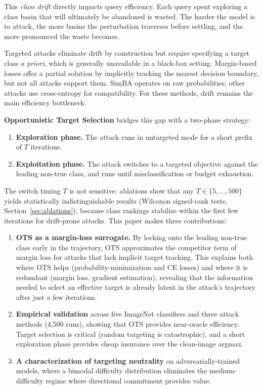 \documentclass{cap2026}
\begin{document}
This \textit{class drift} directly impacts query efficiency. Each query spent exploring a class basin that will ultimately be abandoned is wasted. The harder the model is to attack, the more basins the perturbation traverses before settling, and the more pronounced the waste becomes.

Targeted attacks eliminate drift by construction but require specifying a target class \textit{a priori}, which is generally unavailable in a black-box setting. Margin-based losses \citep{carlini2017towards} offer a partial solution by implicitly tracking the nearest decision boundary, but not all attacks support them. SimBA operates on raw probabilities; other attacks use cross-entropy for compatibility. For these methods, drift remains the main efficiency bottleneck.

\textbf{Opportunistic Target Selection} bridges this gap with a two-phase strategy:
\begin{enumerate}
    \item \textbf{Exploration phase.} The attack runs in untargeted mode for a short prefix of $T$ iterations.
    \item \textbf{Exploitation phase.} The attack switches to a targeted objective against the leading non-true class, and runs until misclassification or budget exhaustion.
\end{enumerate}

The switch timing $T$ is not sensitive: ablations show that any $T \in \{5, \ldots, 500\}$ yields statistically indistinguishable results (Wilcoxon signed-rank tests, Section~\ref{sec:ablations}), because class rankings stabilize within the first few iterations for drift-prone attacks. This paper makes three contributions:

\begin{enumerate}
    \item \textbf{OTS as a margin-loss surrogate.} By locking onto the leading non-true class early in the trajectory, OTS approximates the competitor term of margin loss for attacks that lack implicit target tracking. This explains both where OTS helps (probability-minimization and CE losses) and where it is redundant (margin loss, gradient estimation), revealing that the information needed to select an effective target is already latent in the attack's trajectory after just a few iterations.
    \item \textbf{Empirical validation} across five ImageNet classifiers and three attack methods (4,500 runs), showing that OTS provides near-oracle efficiency. Target selection is critical (random targeting is catastrophic), and a short exploration phase provides cheap insurance over the clean-image argmax.
    \item \textbf{A characterization of targeting neutrality} on adversarially-trained models, where a bimodal difficulty distribution eliminates the medium-difficulty regime where directional commitment provides value.
\end{enumerate}
\end{document}
